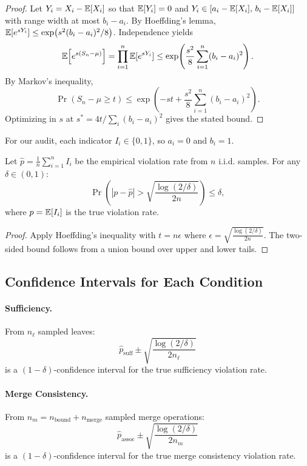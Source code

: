 \begin{proof}
Let $Y_i=X_i-\mathbb{E}[X_i]$ so that $\mathbb{E}[Y_i]=0$ and $Y_i\in[a_i-\mathbb{E}[X_i],\,b_i-\mathbb{E}[X_i]]$ with range width at most $b_i-a_i$. By Hoeffding's lemma,
$\mathbb{E}[e^{sY_i}]\le \exp\!\left(s^2(b_i-a_i)^2/8\right)$. Independence yields
\[
\mathbb{E}\!\left[e^{s(S_n-\mu)}\right]=\prod_{i=1}^n \mathbb{E}[e^{sY_i}]
\le \exp\!\left(\frac{s^2}{8}\sum_{i=1}^n (b_i-a_i)^2\right).
\]
By Markov's inequality,
\[
\Pr(S_n-\mu\ge t)\le \exp\!\left(-st+\frac{s^2}{8}\sum_{i=1}^n (b_i-a_i)^2\right).
\]
Optimizing in $s$ at $s^*=4t/\sum_i(b_i-a_i)^2$ gives the stated bound.
\end{proof}

For our audit, each indicator $I_i \in \{0, 1\}$, so $a_i = 0$ and $b_i = 1$.

\begin{corollary}
Let $\hat{p} = \frac{1}{n} \sum_{i=1}^n I_i$ be the empirical violation rate from $n$ i.i.d. samples. For any $\delta \in (0, 1)$:
\[
\Pr\left( |p - \hat{p}| > \sqrt{\frac{\log(2/\delta)}{2n}} \right) \le \delta,
\]
where $p = \mathbb{E}[I_i]$ is the true violation rate.
\end{corollary}

\begin{proof}
Apply Hoeffding's inequality with $t = n\epsilon$ where $\epsilon = \sqrt{\frac{\log(2/\delta)}{2n}}$. The two-sided bound follows from a union bound over upper and lower tails.
\end{proof}

\subsection{Confidence Intervals for Each Condition}

\paragraph{Sufficiency.}
From $n_\ell$ sampled leaves:
\[
\hat{p}_{\text{suff}} \pm \sqrt{\frac{\log(2/\delta)}{2n_\ell}}
\]
is a $(1-\delta)$-confidence interval for the true sufficiency violation rate.

\paragraph{Merge Consistency.}
From $n_m = n_{\text{bound}} + n_{\text{merge}}$ sampled merge operations:
\[
\hat{p}_{\text{assoc}} \pm \sqrt{\frac{\log(2/\delta)}{2n_m}}
\]
is a $(1-\delta)$-confidence interval for the true merge consistency violation rate.

